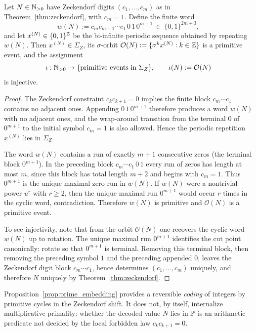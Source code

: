 \begin{proposition}
\label{prop:prime_embedding}
Let $N\in\mathbb{N}_{>0}$ have Zeckendorf digits $(c_1,\dots,c_m)$ as in Theorem~\ref{thm:zeckendorf}, with $c_m=1$. Define the finite word
$$
w(N):=c_m c_{m-1}\cdots c_1\,0\,1\,0^{m+1}\ \in\ \{0,1\}^{2m+3},
$$
and let $x^{(N)}\in\{0,1\}^{\mathbb{Z}}$ be the bi-infinite periodic sequence obtained by repeating $w(N)$.
Then $x^{(N)}\in\Sigma_Z$, its $\sigma$-orbit $\mathcal{O}(N):=\{\sigma^k x^{(N)}:k\in\mathbb{Z}\}$ is a primitive event, and the assignment
$$
\iota:\mathbb{N}_{>0}\to\{\text{primitive events in }\Sigma_Z\},\qquad \iota(N):=\mathcal{O}(N)
$$
is injective.
\end{proposition}

\begin{proof}
The Zeckendorf constraint $c_k c_{k+1}=0$ implies the finite block $c_m\cdots c_1$ contains no adjacent ones. Appending $0\,1\,0^{m+1}$ therefore produces a word $w(N)$ with no adjacent ones, and the wrap-around transition from the terminal $0$ of $0^{m+1}$ to the initial symbol $c_m=1$ is also allowed. Hence the periodic repetition $x^{(N)}$ lies in $\Sigma_Z$.

The word $w(N)$ contains a run of exactly $m+1$ consecutive zeros (the terminal block $0^{m+1}$). In the preceding block $c_m\cdots c_1\,0\,1$ every run of zeros has length at most $m$, since this block has total length $m+2$ and begins with $c_m=1$. Thus $0^{m+1}$ is the unique maximal zero run in $w(N)$.
If $w(N)$ were a nontrivial power $u^r$ with $r\ge 2$, then the unique maximal run $0^{m+1}$ would occur $r$ times in the cyclic word, contradiction. Therefore $w(N)$ is primitive and $\mathcal{O}(N)$ is a primitive event.

To see injectivity, note that from the orbit $\mathcal{O}(N)$ one recovers the cyclic word $w(N)$ up to rotation. The unique maximal run $0^{m+1}$ identifies the cut point canonically: rotate so that $0^{m+1}$ is terminal. Removing this terminal block, then removing the preceding symbol $1$ and the preceding appended $0$, leaves the Zeckendorf digit block $c_m\cdots c_1$, hence determines $(c_1,\dots,c_m)$ uniquely, and therefore $N$ uniquely by Theorem~\ref{thm:zeckendorf}.
\end{proof}

\begin{remark}
Proposition~\ref{prop:prime_embedding} provides a reversible \emph{coding} of integers by primitive cycles in the Zeckendorf shift. It does not, by itself, internalize multiplicative primality: whether the decoded value $N$ lies in $\mathbb{P}$ is an arithmetic predicate not decided by the local forbidden law $c_k c_{k+1}=0$.
\end{remark}

